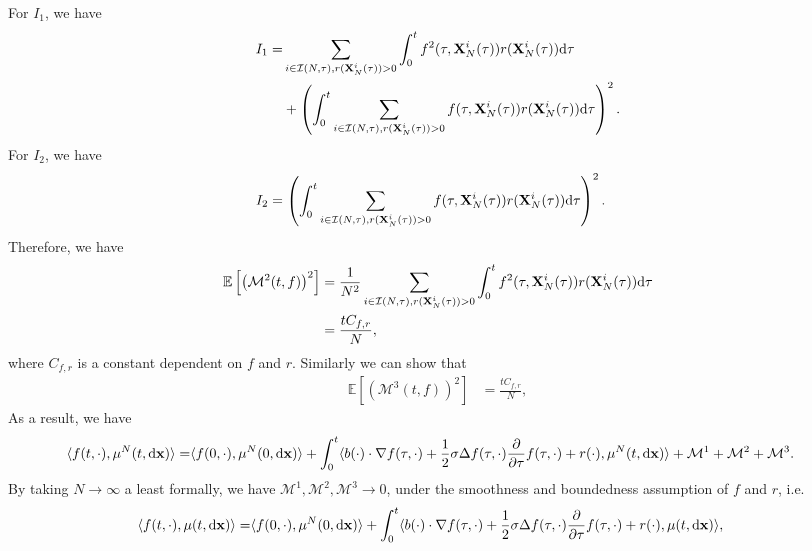 \documentclass[12pt]{article}
\begin{document}
For $I_1$, we have 
\begin{equation*}
    \begin{aligned}
        I_1 =& \sum_{i\in \mathcal I(N,\tau), r(\mathbf{X}^i_N(\tau))>0}\int_0^{t}f^2(\tau,\mathbf{X}_N^i(\tau))r(\mathbf{X}_N^i(\tau)) \mathrm{d} \tau\\
        &+\left(\int_0^{t} \sum_{i\in \mathcal I(N,\tau), r(\mathbf{X}^i_N(\tau))>0}  f(\tau,\mathbf{X}_N^i(\tau))r(\mathbf{X}_N^i(\tau))\mathrm{d} \tau\right)^2.
    \end{aligned}
\end{equation*}
For $I_2$, we have
\begin{equation*}
    \begin{aligned}
        I_2 &= \left(\int_0^{t} \sum_{i\in \mathcal I(N,\tau), r(\mathbf{X}^i_N(\tau))>0}  f(\tau,\mathbf{X}_N^i(\tau))r(\mathbf{X}_N^i(\tau))\mathrm{d} \tau\right)^2.
    \end{aligned}
\end{equation*}
Therefore, we have
$$
\begin{aligned}
\mathbb E\left[ \left(\mathcal M^2(t,f) \right)^2\right] &= \frac{1}{N^2}\sum_{i\in \mathcal I(N,\tau), r(\mathbf{X}^i_N(\tau))>0}\int_0^{t}f^2(\tau,\mathbf{X}_N^i(\tau))r(\mathbf{X}_N^i(\tau)) \mathrm{d} \tau\\
    & = \frac{t C_{f,r}}{N},
\end{aligned}
$$
where $C_{f,r}$ is a constant dependent on $f$ and $r$. Similarly we can show that 
$$
\begin{aligned}
\mathbb E\left[ \left(\mathcal M^3(t,f) \right)^2\right] 
    & = \frac{t C_{f,r}}{N},
\end{aligned}
$$
As a result, we have
\begin{equation}
    \begin{aligned}
         \langle f(t,\cdot),\mu^N(t,\mathrm{d} \mathbf{x})\rangle = &\langle f(0,\cdot), \mu^N(0,\mathrm{d} \mathbf{x})\rangle + \int_0^t\langle b(\cdot)\cdot \nabla f (\tau,\cdot) + \frac{1}{2}\sigma \Delta f(\tau,\cdot) \frac{\partial}{\partial \tau} f(\tau,\cdot) +r(\cdot),\mu^N(t,\mathrm{d} \mathbf{x})\rangle + \mathcal M^1+\mathcal M^2 + \mathcal M^3.
    \end{aligned}
\end{equation}
By taking $N\to \infty$ a least formally, we have $\mathcal M^1,\mathcal M^2,\mathcal M^3\to 0 $, under the smoothness and boundedness assumption of $f$ and $r$, i.e.
\begin{equation*}
    \begin{aligned}
         \langle f(t,\cdot),\mu(t,\mathrm{d} \mathbf{x})\rangle = &\langle f(0,\cdot), \mu^N(0,\mathrm{d} \mathbf{x})\rangle + \int_0^t\langle b(\cdot)\cdot \nabla f (\tau,\cdot) + \frac{1}{2}\sigma \Delta f(\tau,\cdot) \frac{\partial}{\partial \tau} f(\tau,\cdot) +r(\cdot),\mu(t,\mathrm{d} \mathbf{x})\rangle,
    \end{aligned}
\end{equation*}
\end{document}

